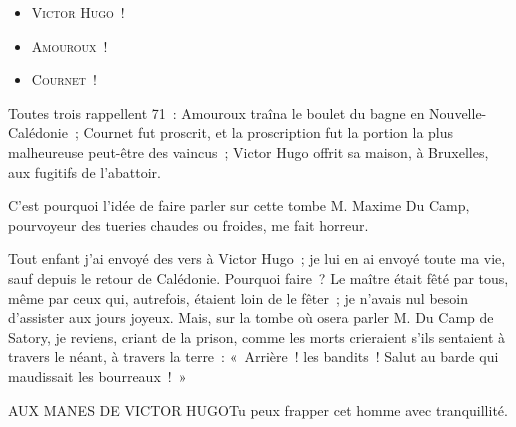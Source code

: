 \documentclass[french,twoside]{book} %
\newcommand{\bibl}[1]{{\RaggedLeft{#1}\par\bigskip}}
\newenvironment{quoteblock}%
  {\begin{quoting}}
  {\end{quoting}}
\newenvironment{quotebar}{%
    \def\FrameCommand{{\color{rubric!10!}\vrule width 0.5em} \hspace{0.9em}}%
    \def\OuterFrameSep{\itemsep} %
    \MakeFramed {\advance\hsize-\width \FrameRestore}
  }%
  {%
    \endMakeFramed
  }
\renewenvironment{quoteblock}%
  {%
    \savenotes
    \setstretch{0.9}
    \normalfont
    \begin{quotebar}
  }
  {%
    \end{quotebar}
    \spewnotes
  }
\begin{document}
\begin{itemize}[itemsep=0pt,]
\item V{\scshape ictor} H{\scshape ugo} !
\item A{\scshape mouroux} !
\item C{\scshape ournet} !
\end{itemize}

\noindent Toutes trois rappellent 71 : Amouroux traîna le boulet du bagne en Nouvelle-Calédonie ; Cournet fut proscrit, et la proscription fut la portion la plus malheureuse peut-être des vaincus ; Victor Hugo offrit sa maison, à Bruxelles, aux fugitifs de l’abattoir.\par
C’est pourquoi l’idée de faire parler sur cette tombe M. Maxime Du Camp, pourvoyeur des tueries chaudes ou froides, me fait horreur.\par
Tout enfant j’ai envoyé des vers à Victor Hugo ;  je lui en ai envoyé toute ma vie, sauf depuis le retour de Calédonie. Pourquoi faire ? Le maître était fêté par tous, même par ceux qui, autrefois, étaient loin de le fêter ; je n’avais nul besoin d’assister aux jours joyeux. Mais, sur la tombe où osera parler M. Du Camp de Satory, je reviens, criant de la prison, comme les morts crieraient s’ils sentaient à travers le néant, à travers la terre : « Arrière ! les bandits ! Salut au barde qui maudissait les bourreaux ! »\par

\begin{quoteblock}
AUX MANES DE VICTOR HUGO\noindent Tu peux frapper cet homme avec tranquillité.\par

\bibl{V{\scshape ictor} H{\scshape ugo}.}
\end{quoteblock}
\end{document}
